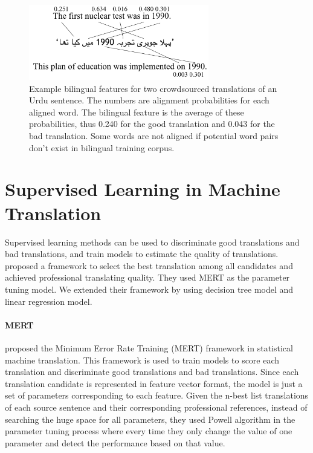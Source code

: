 \begin{figure}[!htb]
  \centering
  \includegraphics[width=0.7\textwidth]{bilingualexample/example.png}
  \caption{Example bilingual features for two crowdsourced translations of an Urdu sentence. The numbers are alignment probabilities for each aligned word. The bilingual feature is the average of these probabilities, thus 0.240 for the good translation and 0.043 for the bad translation. Some words are not aligned if potential word pairs don't exist in bilingual training corpus.
}
    \label{biexample1}
\end{figure}

\section{Supervised Learning in Machine Translation}
Supervised learning methods can be used to discriminate good translations and bad translations, and train models to estimate the quality of translations. \cite{zaidan-callisonburch:2011:ACL-HLT2011a} proposed a framework to select the best translation among all candidates and achieved professional translating quality. They used MERT as the parameter tuning model. We extended their framework by using decision tree model and linear regression model.

\paragraph{MERT}

 proposed the Minimum Error Rate Training (MERT) framework in statistical machine translation. This framework is used to train models to score each translation and discriminate good translations and bad translations. Since each translation candidate is represented in feature vector format, the model is just a set of parameters corresponding to each feature. Given the n-best list translations of each source sentence and their corresponding professional references, instead of searching the huge space for all parameters, they used Powell algorithm \cite{powellefficient} in the parameter tuning process where every time they only change the value of one parameter and detect the performance based on that value. 

